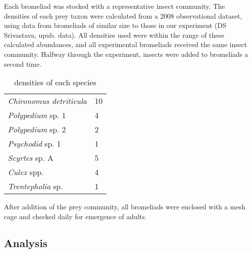 \documentclass[10pt]{article}
\begin{document}
\begin{spacing}{2}
Each bromeliad was stocked with a representative insect community.
The densities of each prey taxon were calculated from a 2008
observational dataset, using data from bromeliads of similar size to
those in our experiment (DS Srivastava, upub. data).  All densities
used were within the range of these calculated abundances, and all
experimental bromeliads received the same insect community.  Halfway
through the experiment, insects were added to bromeliads a second
time.

\begin{table}
  \centering
  \caption{densities of each species}
  \label{tab:sppden}
  \begin{tabular}{l l}
    \hline
    \emph{Chironomus detriticula} & 10 \\
    \emph{Polypedium} sp. 1 & 4 \\
    \emph{Polypedium} sp. 2 & 2 \\
    \emph{Psychodid} sp. 1 & 1 \\
    \emph{Scyrtes} sp. A & 5 \\
    \emph{Culex} spp. & 4 \\
    \emph{Trentepholia} sp. & 1
  \end{tabular}
\end{table}



After addition of the prey community, all bromeliads were enclosed
with a mesh cage and checked daily for emergence of adults.





\subsection{Analysis}
\label{sec:analy}



\end{spacing}
\end{document}
